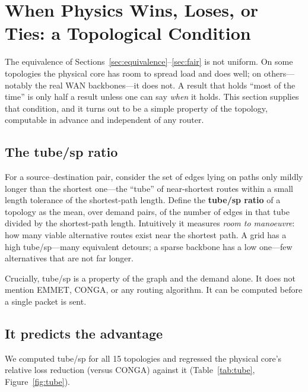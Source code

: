 \section{When Physics Wins, Loses, or Ties: a Topological Condition}
\label{sec:applicability}

The equivalence of Sections~\ref{sec:equivalence}--\ref{sec:fair} is not
uniform. On some topologies the physical core has room to spread load and does
well; on others---notably the real WAN backbones---it does not. A result that
holds ``most of the time'' is only half a result unless one can say \emph{when}
it holds. This section supplies that condition, and it turns out to be a simple
property of the topology, computable in advance and independent of any router.

\subsection{The tube/sp ratio}

For a source--destination pair, consider the set of edges lying on paths only
mildly longer than the shortest one---the ``tube'' of near-shortest routes
within a small length tolerance of the shortest-path length. Define the
\textbf{tube/sp ratio} of a topology as the mean, over demand pairs, of the
number of edges in that tube divided by the shortest-path length. Intuitively
it measures \emph{room to manoeuvre}: how many viable alternative routes exist
near the shortest path. A grid has a high tube/sp---many equivalent detours; a
sparse backbone has a low one---few alternatives that are not far longer.

Crucially, tube/sp is a property of the graph and the demand alone. It does not
mention EMMET, CONGA, or any routing algorithm. It can be computed before a
single packet is sent.

\subsection{It predicts the advantage}

We computed tube/sp for all 15 topologies and regressed the physical core's
relative loss reduction (versus CONGA) against it (Table~\ref{tab:tube},
Figure~\ref{fig:tube}).

